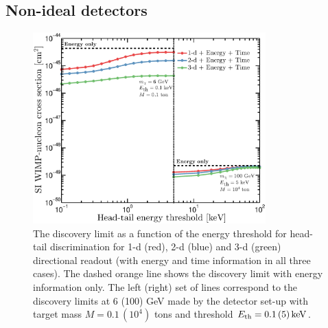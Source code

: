 \subsection{Non-ideal detectors}\label{sec:nufloor_nonideal}
\label{sec:nufloor_sense}
\begin{figure}
\begin{center}
\includegraphics[width=0.8\textwidth,angle=0]{Figures/HeadTail_combined.eps}
\caption[Neutrino floor as a function of head-tail discrimination threshold]{
The discovery limit as a function of the energy threshold for head-tail discrimination for 1-d (red), 2-d (blue) and 3-d (green) directional readout (with energy and time information in all three cases). The dashed orange line shows the discovery limit with energy information only.
The left (right) set of lines correspond to the discovery limits at 6 (100) GeV made by the detector set-up with target mass $M=0.1 \, (10^4)$ tons and threshold $E_{\rm th} = 0.1 \, (5) \, {\rm keV}$. }
\label{fig:headtail}
\end{center}
\end{figure} 


